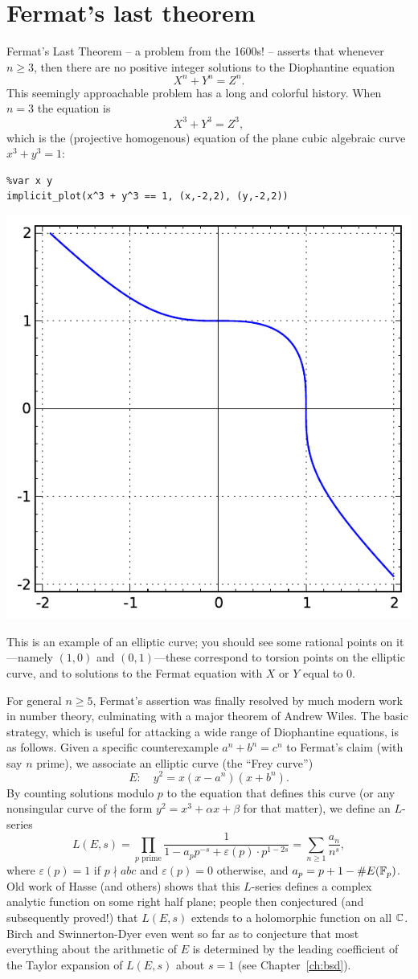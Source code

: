 \documentclass{book}
\begin{document}
\section{Fermat's last theorem}\label{sec:fltintro}
Fermat's Last Theorem -- a problem from the 1600s! -- asserts
that whenever $n\geq 3$, then there are no positive integer
solutions to the Diophantine equation
$$
X^n + Y^n = Z^n.
$$
This seemingly approachable problem has a long and colorful
history.
When $n=3$ the equation is
$$
X^3 + Y^3 = Z^3,
$$
which is the (projective homogenous) equation of the plane cubic algebraic
curve $x^3 + y^3 = 1$:
\begin{lstlisting}
%var x y
implicit_plot(x^3 + y^3 == 1, (x,-2,2), (y,-2,2))
\end{lstlisting}
\begin{center}
\includegraphics[width=.5\textwidth]{pics/flt3.pdf}
\end{center}
This is an example of an elliptic curve; you should
see some rational points on it---namely $(1,0)$ and $(0,1)$---these
correspond to torsion points on the elliptic curve, and to solutions
to the Fermat equation with $X$ or $Y$ equal to $0$.

For general $n\geq 5$, Fermat's assertion was finally resolved by much modern
work in number theory, culminating with a major theorem of
Andrew Wiles.  The basic strategy, which is useful for
attacking a wide range of Diophantine equations, is as follows.
Given a specific counterexample
$a^n + b^n = c^n$ to Fermat's claim (with say $n$ prime), we associate
an elliptic curve (the ``Frey curve'')
$$
  E: \quad y^2 = x(x-a^n)(x+b^n).
$$
By counting solutions modulo $p$ to the equation that defines this curve (or
any nonsingular curve of the form $y^2=x^3+\alpha x + \beta$ for that matter),
we define an $L$-series
$$
L(E,s) =
\prod_{p \text{ prime}} \frac{1}{1-a_p p^{-s} + \varepsilon(p)\cdot p^{1-2s}}
 = \sum_{n\geq 1} \frac{a_n}{n^s},
$$
where $\varepsilon(p)=1$ if $p\nmid abc$ and $\varepsilon(p)=0$ otherwise,
and $a_p = p+1-\#E(\mathbb{F}_p)$.
Old work of Hasse (and others)
shows that this $L$-series defines a complex analytic
function on some right half plane; people then conjectured (and
subsequently proved!)
that $L(E,s)$ extends to a holomorphic function on all $\mathbb{C}$.
Birch and Swinnerton-Dyer even went so far as to conjecture
that most everything about the arithmetic of $E$
is determined by the leading coefficient of the
Taylor expansion of $L(E,s)$ about $s=1$ (see Chapter~\ref{ch:bsd}).
\end{document}
